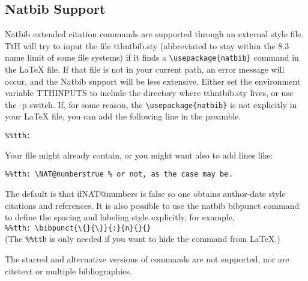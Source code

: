 \documentclass[12pt]{article}
\begin{document}
\subsection{Natbib Support}

Natbib extended citation commands are supported through an external
style file. TtH will try to input
the file tthntbib.sty (abbreviated to stay within the 8.3 name limit
of some file systems) if it finds a \verb!\usepackage{natbib}! command
in the LaTeX file. If that file is not in your current path, an error
message will occur, and the Natbib support will be less extensive.
Either set the environment variable TTHINPUTS to include the directory
where tthntbib.sty lives, or use the -p switch. If, for some reason,
the \verb!\usepackage{natbib}! is not explicitly in your LaTeX file,
you can add the following line in the preamble.
\begin{verbatim}
%%tth: 
\end{verbatim}
Your file might already contain, or you might want also to add lines like:
\begin{verbatim}
%%tth: \NAT@numberstrue % or not, as the case may be.
\end{verbatim}
The default is that ifNAT@numbers is false so one obtains author-date
style citations and references. It is also possible to use the natbib
bibpunct command to define the spacing and labeling style explicitly,
for example,\\ 
\verb|%%tth: \bibpunct{\{}{\}}{:}{n}{}{}|
\\ (The \verb!%%tth! is only needed if you want to hide the command 
from LaTeX.)

The starred
and alternative versions of commands are not supported, nor are
citetext or multiple bibliographies.
\end{document}

